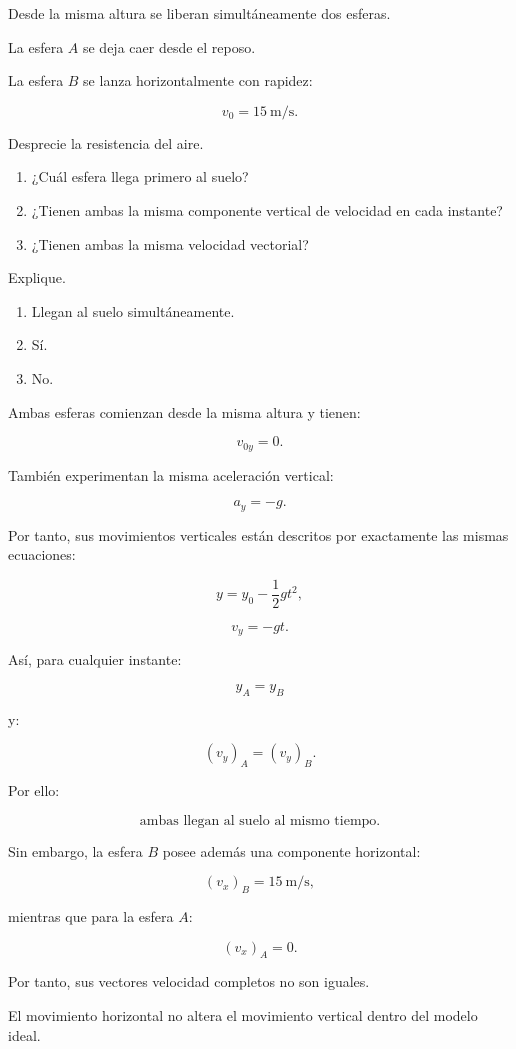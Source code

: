 \begin{ejercicio}
Desde la misma altura se liberan simultáneamente dos esferas.

La esfera \(A\) se deja caer desde el reposo.

La esfera \(B\) se lanza horizontalmente con rapidez:

\[
v_0=\SI{15}{\meter\per\second}.
\]

Desprecie la resistencia del aire.

\begin{enumerate}[label=\alph*)]
    \item ¿Cuál esfera llega primero al suelo?
    \item ¿Tienen ambas la misma componente vertical de velocidad en cada instante?
    \item ¿Tienen ambas la misma velocidad vectorial?
\end{enumerate}

Explique.
\end{ejercicio}

\begin{respuesta}
\begin{enumerate}[label=\alph*)]
    \item Llegan al suelo simultáneamente.
    \item Sí.
    \item No.
\end{enumerate}
\end{respuesta}

\begin{explicacion}
Ambas esferas comienzan desde la misma altura y tienen:

\[
v_{0y}=0.
\]

También experimentan la misma aceleración vertical:

\[
a_y=-g.
\]

Por tanto, sus movimientos verticales están descritos por exactamente las mismas
ecuaciones:

\[
y
=
y_0-\frac{1}{2}gt^2,
\]

\[
v_y=-gt.
\]

Así, para cualquier instante:

\[
y_A=y_B
\]

y:

\[
(v_y)_A=(v_y)_B.
\]

Por ello:

\[
\boxed{\text{ambas llegan al suelo al mismo tiempo}}.
\]

Sin embargo, la esfera \(B\) posee además una componente horizontal:

\[
(v_x)_B=\SI{15}{\meter\per\second},
\]

mientras que para la esfera \(A\):

\[
(v_x)_A=0.
\]

Por tanto, sus vectores velocidad completos no son iguales.

El movimiento horizontal no altera el movimiento vertical dentro del modelo
ideal.
\end{explicacion}


